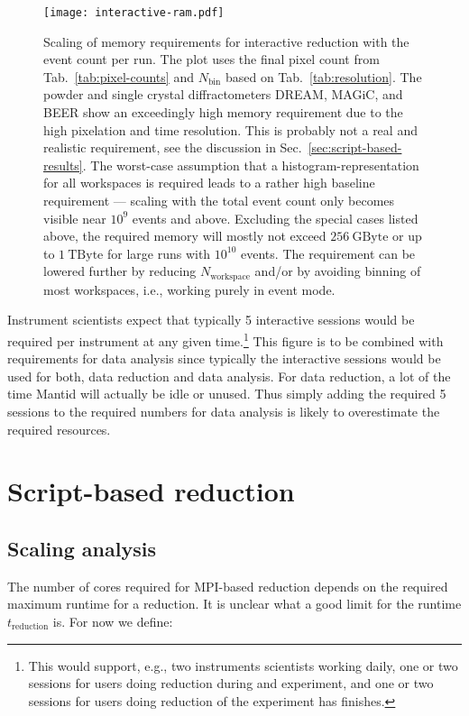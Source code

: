 \documentclass[a4paper,english,numbers=noenddot,bibliography=totoc,chapterprefix=on,DIV=12]{scrartcl}
\newcommand{\Treduction}{t_{\text{reduction}}}
\newcommand{\Nbin}{N_{\text{bin}}}
\newcommand{\Nworkspace}{N_{\text{workspace}}}
\newcommand{\beer}{BEER\xspace}
\newcommand{\dream}{DREAM\xspace}
\newcommand{\magic}{MAGiC\xspace}
\newcommand{\mantid}{Mantid\xspace}
\begin{document}
\begin{figure}
  \centering
\texttt{[image: interactive-ram.pdf]}
\caption{\label{fig:interactive-ram}
Scaling of memory requirements for interactive reduction with the event count per run.
The plot uses the final pixel count from Tab.~\ref{tab:pixel-counts} and $\Nbin$ based on Tab.~\ref{tab:resolution}.
The powder and single crystal diffractometers \dream, \magic, and \beer show an exceedingly high memory requirement due to the high pixelation and time resolution.
This is probably not a real and realistic requirement, see the discussion in Sec.~\ref{sec:script-based-results}.
The worst-case assumption that a histogram-representation for all workspaces is required leads to a rather high baseline requirement --- scaling with the total event count only becomes visible near $10^9$ events and above.
Excluding the special cases listed above, the required memory will mostly not exceed $256~\mathrm{GByte}$ or up to $1~\mathrm{TByte}$ for large runs with $10^{10}$ events.
The requirement can be lowered further by reducing $\Nworkspace$ and/or by avoiding binning of most workspaces, i.e., working purely in event mode.
}
\end{figure}

Instrument scientists expect that typically 5 interactive sessions would be required per instrument at any given time.\footnote{This would support, e.g., two instruments scientists working daily, one or two sessions for users doing reduction during and experiment, and one or two sessions for users doing reduction of the experiment has finishes.}
This figure is to be combined with requirements for data analysis since typically the interactive sessions would be used for both, data reduction and data analysis.
For data reduction, a lot of the time \mantid will actually be idle or unused.
Thus simply adding the required 5 sessions to the required numbers for data analysis is likely to overestimate the required resources.




\section{Script-based reduction}


\subsection{Scaling analysis}
\label{sec:scaling-analysis}

The number of cores required for MPI-based reduction depends on the required maximum runtime for a reduction.
It is unclear what a good limit for the runtime $\Treduction$ is.
For now we define:
\end{document}
